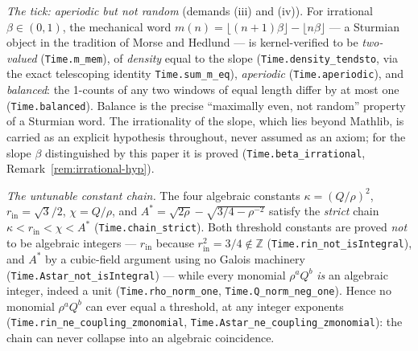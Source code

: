 \documentclass[11pt]{amsart}
\theoremstyle{plain}
\theoremstyle{definition}
\theoremstyle{remark}
\begin{document}
\emph{The tick: aperiodic but not random} (demands (iii) and (iv)). For irrational $\beta \in (0,1)$, the mechanical word $m(n) = \lfloor (n+1)\beta \rfloor - \lfloor n\beta \rfloor$ --- a Sturmian object in the tradition of Morse and Hedlund \cite{morsehedlund1940,lothaire2002} --- is kernel-verified to be \emph{two-valued} (\texttt{Time.m\_mem}), of \emph{density} equal to the slope (\texttt{Time.density\_tendsto}, via the exact telescoping identity \texttt{Time.sum\_m\_eq}), \emph{aperiodic} (\texttt{Time.aperiodic}), and \emph{balanced}: the 1-counts of any two windows of equal length differ by at most one (\texttt{Time.balanced}). Balance is the precise ``maximally even, not random'' property of a Sturmian word. The irrationality of the slope, which lies beyond Mathlib, is carried as an explicit hypothesis throughout, never assumed as an axiom; for the slope $\beta$ distinguished by this paper it is proved (\texttt{Time.beta\_irrational}, Remark~\ref{rem:irrational-hyp}).

\emph{The untunable constant chain.} The four algebraic constants $\kappa = (Q/\rho)^2$, $r_{\mathrm{in}} = \sqrt{3}/2$, $\chi = Q/\rho$, and $A^* = \sqrt{2\rho} - \sqrt{3/4 - \rho^{-2}}$ satisfy the \emph{strict} chain $\kappa < r_{\mathrm{in}} < \chi < A^*$ (\texttt{Time.chain\_strict}). Both threshold constants are proved \emph{not} to be algebraic integers --- $r_{\mathrm{in}}$ because $r_{\mathrm{in}}^2 = 3/4 \notin \mathbb{Z}$ (\texttt{Time.rin\_not\_isIntegral}), and $A^*$ by a cubic-field argument using no Galois machinery (\texttt{Time.Astar\_not\_isIntegral}) --- while every monomial $\rho^a Q^b$ \emph{is} an algebraic integer, indeed a unit (\texttt{Time.rho\_norm\_one}, \texttt{Time.Q\_norm\_neg\_one}). Hence no monomial $\rho^a Q^b$ can ever equal a threshold, at any integer exponents (\texttt{Time.rin\_ne\_coupling\_zmonomial}, \texttt{Time.Astar\_ne\_coupling\_zmonomial}): the chain can never collapse into an algebraic coincidence.
\end{document}
